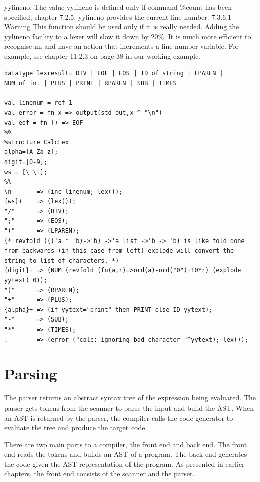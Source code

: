 \documentclass[8pt, a4paper, oneside, twocolumn]{extarticle}
\begin{document}
yylineno: 
The value yylineno is defined only if command \%count has been specified, chapter 7.2.5.
yylineno provides the current line number.
7.3.6.1 Warning This function should be used only if it is really needed. Adding
the yylineno facility to a lexer will slow it down by 20\%. It is much more efficient to
recognise nn and have an action that increments a line-number variable. For example,
see chapter 11.2.3 on page 38 in our working example.
\begin{verbatim}
datatype lexresult= DIV | EOF | EOS | ID of string | LPAREN |
NUM of int | PLUS | PRINT | RPAREN | SUB | TIMES 

val linenum = ref 1
val error = fn x => output(std_out,x ^ "\n")
val eof = fn () => EOF
%%
%structure CalcLex
alpha=[A-Za-z];
digit=[0-9];
ws = [\ \t];
%%
\n       => (inc linenum; lex());
{ws}+    => (lex());
"/"      => (DIV);
";"      => (EOS);
"("      => (LPAREN);
(* revfold ((('a * 'b)->'b) ->'a list ->'b -> 'b) is like fold done from backwards (in this case from left) explode will convert the string to list of characters. *)
{digit}+ => (NUM (revfold (fn(a,r)=>ord(a)-ord("0")+10*r) (explode yytext) 0));
")"      => (RPAREN);
"+"      => (PLUS);
{alpha}+ => (if yytext="print" then PRINT else ID yytext);
"-"      => (SUB);
"*"      => (TIMES);
.        => (error ("calc: ignoring bad character "^yytext); lex());
\end{verbatim}
\section{Parsing}
The parser returns an abstract syntax tree of the expression being evaluated. The parser gets tokens from the scanner to parse the input and build the AST. When an AST is
returned by the parser, the compiler calls the code generator to evaluate the tree and produce the target code.

There are two main parts to a compiler, the front end and back end. The front end
reads the tokens and builds an AST of a program. The back end generates the code
given the AST representation of the program. As presented in earlier chapters, the
front end consists of the scanner and the parser.
\end{document}

